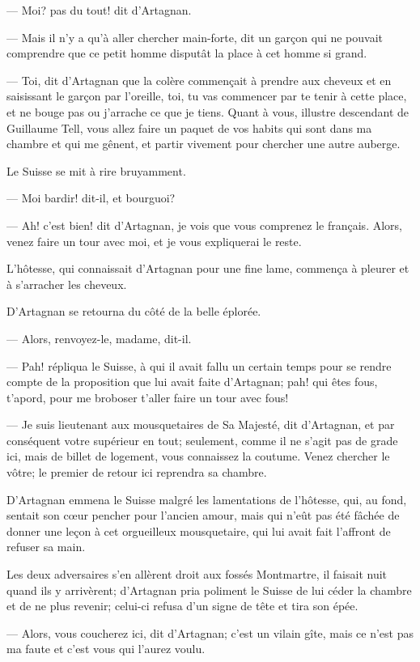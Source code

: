 — Moi? pas du tout! dit d'Artagnan.

— Mais il n'y a qu'à aller chercher main-forte, dit un garçon qui ne pouvait comprendre que ce petit homme disputât la place à cet homme si grand.

— Toi, dit d'Artagnan que la colère commençait à prendre aux cheveux et en saisissant le garçon par l'oreille, toi, tu vas commencer par te tenir à cette place, et ne bouge pas ou j'arrache ce que je tiens. Quant à vous, illustre descendant de Guillaume Tell, vous allez faire un paquet de vos habits qui sont dans ma chambre et qui me gênent, et partir vivement pour chercher une autre auberge.

Le Suisse se mit à rire bruyamment.

— Moi bardir! dit-il, et bourguoi?

— Ah! c'est bien! dit d'Artagnan, je vois que vous comprenez le français. Alors, venez faire un tour avec moi, et je vous expliquerai le reste.

L'hôtesse, qui connaissait d'Artagnan pour une fine lame, commença à pleurer et à s'arracher les cheveux.

D'Artagnan se retourna du côté de la belle éplorée.

— Alors, renvoyez-le, madame, dit-il.

— Pah! répliqua le Suisse, à qui il avait fallu un certain temps pour se rendre compte de la proposition que lui avait faite d'Artagnan; pah! qui êtes fous, t'apord, pour me broboser t'aller faire un tour avec fous!

— Je suis lieutenant aux mousquetaires de Sa Majesté, dit d'Artagnan, et par conséquent votre supérieur en tout; seulement, comme il ne s'agit pas de grade ici, mais de billet de logement, vous connaissez la coutume. Venez chercher le vôtre; le premier de retour ici reprendra sa chambre.

D'Artagnan emmena le Suisse malgré les lamentations de l'hôtesse, qui, au fond, sentait son cœur pencher pour l'ancien amour, mais qui n'eût pas été fâchée de donner une leçon à cet orgueilleux mousquetaire, qui lui avait fait l'affront de refuser sa main.

Les deux adversaires s'en allèrent droit aux fossés Montmartre, il faisait nuit quand ils y arrivèrent; d'Artagnan pria poliment le Suisse de lui céder la chambre et de ne plus revenir; celui-ci refusa d'un signe de tête et tira son épée.

— Alors, vous coucherez ici, dit d'Artagnan; c'est un vilain gîte, mais ce n'est pas ma faute et c'est vous qui l'aurez voulu.

